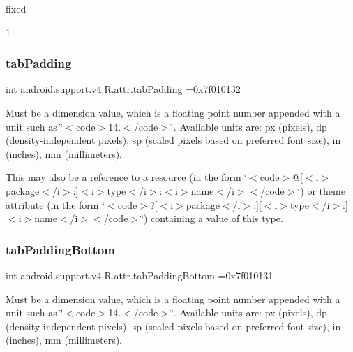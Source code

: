 {\ttfamily fixed}

1\mbox{\label{classandroid_1_1support_1_1v4_1_1R_1_1attr_a70e00cd44bcb59cc8adb7ddc6003d584}} 
\subsubsection{\texorpdfstring{tab\+Padding}{tabPadding}}
{\footnotesize\ttfamily int android.\+support.\+v4.\+R.\+attr.\+tab\+Padding =0x7f010132\hspace{0.3cm}{\ttfamily [static]}}

Must be a dimension value, which is a floating point number appended with a unit such as \char`\"{}$<$code$>$14.\+5sp$<$/code$>$\char`\"{}. Available units are\+: px (pixels), dp (density-\/independent pixels), sp (scaled pixels based on preferred font size), in (inches), mm (millimeters). 

This may also be a reference to a resource (in the form \char`\"{}$<$code$>$@\mbox{[}$<$i$>$package$<$/i$>$\+:\mbox{]}$<$i$>$type$<$/i$>$\+:$<$i$>$name$<$/i$>$$<$/code$>$\char`\"{}) or theme attribute (in the form \char`\"{}$<$code$>$?\mbox{[}$<$i$>$package$<$/i$>$\+:\mbox{]}\mbox{[}$<$i$>$type$<$/i$>$\+:\mbox{]}$<$i$>$name$<$/i$>$$<$/code$>$\char`\"{}) containing a value of this type. \mbox{\label{classandroid_1_1support_1_1v4_1_1R_1_1attr_a53cfe2100a0ac56209ac806c16b017d1}} 
\subsubsection{\texorpdfstring{tab\+Padding\+Bottom}{tabPaddingBottom}}
{\footnotesize\ttfamily int android.\+support.\+v4.\+R.\+attr.\+tab\+Padding\+Bottom =0x7f010131\hspace{0.3cm}{\ttfamily [static]}}

Must be a dimension value, which is a floating point number appended with a unit such as \char`\"{}$<$code$>$14.\+5sp$<$/code$>$\char`\"{}. Available units are\+: px (pixels), dp (density-\/independent pixels), sp (scaled pixels based on preferred font size), in (inches), mm (millimeters). 

